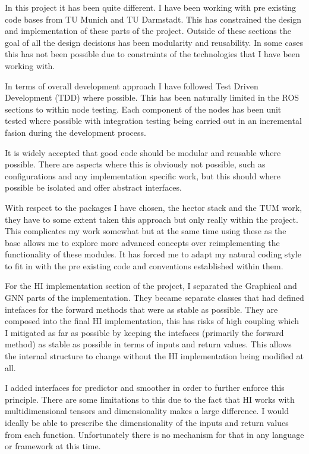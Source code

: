 \documentclass[]{../resources/final_report}
\begin{document}
In this project it has been quite different. I have been working with pre existing code bases from 
TU Munich and TU Darmstadt. This has constrained the design and implementation of these parts 
of the project. Outside of these sections the goal of all the design decisions has been modularity 
and reusability. In some cases this has not been possible due to constraints of the technologies
that I have been working with.

In terms of overall development approach I have followed Test Driven Development (TDD) where possible.
This has been naturally limited in the ROS sections to within node testing. Each component of the nodes 
has been unit tested where possible with integration testing being carried out in an incremental
fasion during the development process.

It is widely accepted that good code should be modular and reusable where possible. There are 
aspects where this is obviously not possible, such as configurations and any implementation 
specific work, but this should where possible be isolated and offer abstract interfaces.

With respect to the packages I have chosen, the hector stack and the TUM work, they have to some 
extent taken this approach but only really within the project. 
This complicates my work somewhat but at the same time using these as the base allows me to explore
more advanced concepts over reimplementing the functionality of these modules. It has forced me to 
adapt my natural coding style to fit in with the pre existing code and conventions established within
them. 

For the HI implementation section of the project, I separated the Graphical and GNN parts of the implementation.
They became separate classes that had defined intefaces for the forward methods that were as stable as possible.
They are composed into the final HI implementation, this has risks of high coupling which I mitigated as 
far as possible by keeping the intefaces (primarily the forward method) as stable as possible in terms 
of inputs and return values. This allows the internal structure to change without the HI implementation 
being modified at all.

I added interfaces for predictor and smoother in order to further enforce this principle. There are 
some limitations to this due to the fact that HI works with multidimensional tensors and dimensionality 
makes a large difference. I would ideally be able to prescribe the dimensionality of the inputs and 
return values from each function. Unfortunately there is no mechanism for that in any language or 
framework at this time.
\end{document}
